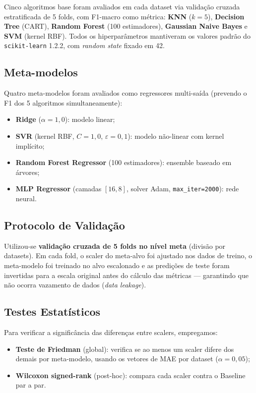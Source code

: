 \documentclass[12pt]{article}
\begin{document}
Cinco algoritmos base foram avaliados em cada dataset via validação cruzada estratificada de 5 folds, com F1-macro como métrica: \textbf{KNN} ($k=5$), \textbf{Decision Tree} (CART), \textbf{Random Forest} (100 estimadores), \textbf{Gaussian Naive Bayes} e \textbf{SVM} (kernel RBF). Todos os hiperparâmetros mantiveram os valores padrão do \texttt{scikit-learn} 1.2.2, com \textit{random state} fixado em 42.

\subsection{Meta-modelos}

Quatro meta-modelos foram avaliados como regressores multi-saída (prevendo o F1 dos 5 algoritmos simultaneamente):
\begin{itemize}
  \item \textbf{Ridge} ($\alpha = 1{,}0$): modelo linear;
  \item \textbf{SVR} (kernel RBF, $C=1{,}0$, $\varepsilon=0{,}1$): modelo não-linear com kernel implícito;
  \item \textbf{Random Forest Regressor} (100 estimadores): ensemble baseado em árvores;
  \item \textbf{MLP Regressor} (camadas $[16, 8]$, solver Adam, \texttt{max\_iter=2000}): rede neural.
\end{itemize}

\subsection{Protocolo de Validação}

Utilizou-se \textbf{validação cruzada de 5 folds no nível meta} (divisão por datasets). Em cada fold, o scaler do meta-alvo foi ajustado nos dados de treino, o meta-modelo foi treinado no alvo escalonado e as predições de teste foram invertidas para a escala original antes do cálculo das métricas --- garantindo que não ocorra vazamento de dados (\textit{data leakage}).

\subsection{Testes Estatísticos}

Para verificar a significância das diferenças entre scalers, empregamos:
\begin{itemize}
  \item \textbf{Teste de Friedman} (global): verifica se ao menos um scaler difere dos demais por meta-modelo, usando os vetores de MAE por dataset ($\alpha = 0{,}05$);
  \item \textbf{Wilcoxon signed-rank} (post-hoc): compara cada scaler contra o Baseline par a par.
\end{itemize}
\end{document}
